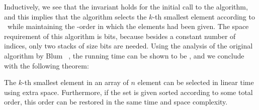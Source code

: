 Inductively, we see that the invariant holds for the initial call to
the algorithm, and this implies that the algorithm selects the $k$-th
smallest element according to \LB\ while maintaining the \LA-order in
which the elements had been given. The space requirement of this
algorithm is  bits, because besides a constant number of
indices, only two stacks of size  bits are needed. Using
the analysis of the original algorithm by Blum 
\etal~\cite{blum:selection}, the running time can be shown to be
, and we conclude with the following theorem:

\begin{theorem}\label{lem:select}
 The $k$-th smallest element in an array of $n$ element can be 
 selected in linear time using  extra space. Furthermore, if 
 the set is given sorted according to some total order, this order 
 can be restored in the same time and space complexity.
\end{theorem}

